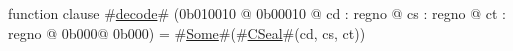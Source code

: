 function clause #\hyperref[zdecode]{decode}# (0b010010 @ 0b00010 @ cd : regno @ cs : regno @ ct : regno @ 0b000@ 0b000) = #\hyperref[zSome]{Some}#(#\hyperref[zCSeal]{CSeal}#(cd, cs, ct))
